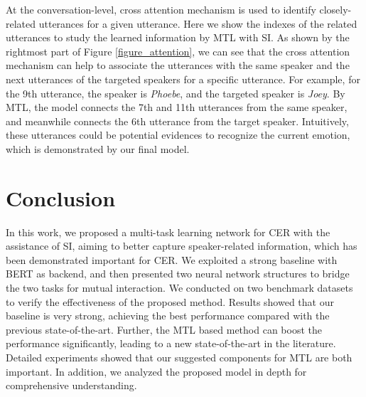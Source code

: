\documentclass{article}
\begin{document}
\begin{CJK}{UTF8}{gbsn}
At the conversation-level, cross attention mechanism is used to identify closely-related utterances for a given utterance.
Here we show the indexes of the related utterances to study the learned information by MTL with SI.
As shown by the rightmost part of Figure \ref{figure_attention}, we can see that 
the cross attention mechanism can help to associate the utterances with the same speaker 
and the next utterances of the targeted speakers for a specific utterance.
For example, for the 9th utterance, the speaker is \textit{Phoebe},
and the targeted speaker is \textit{Joey}.
By MTL, the model connects the 7th and 11th utterances from the same speaker,
and meanwhile connects the 6th utterance from the target speaker. 
Intuitively, these utterances could be potential evidences to recognize the current emotion,
which is demonstrated by our final model.
















\section{Conclusion}

In this work, we proposed a multi-task learning network for CER with the assistance of SI,
aiming to better capture speaker-related information, which has been demonstrated important for CER.
We exploited a strong baseline with BERT as backend, 
and then presented two neural network structures to bridge the two tasks for mutual interaction.
We conducted on two benchmark datasets to verify the effectiveness of the proposed method.
Results showed that our baseline is very strong, achieving the best performance compared with the previous state-of-the-art.
Further, the MTL based method can boost the performance significantly, 
leading to a new state-of-the-art in the literature.
Detailed experiments showed that our suggested components for MTL are both important.
In addition, we analyzed the proposed model in depth for comprehensive understanding.



\newpage



\end{CJK}
\end{document}
